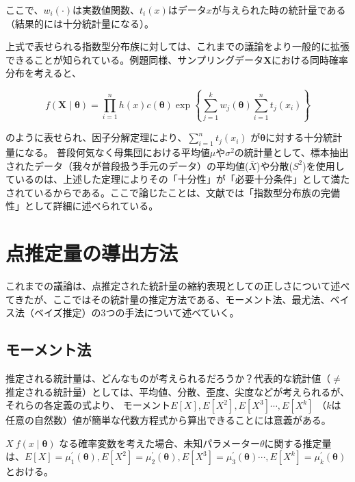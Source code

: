 \documentclass[a4paper,dvipdfmx]{jsarticle}
\begin{document}
ここで、$w_i(\cdot)$は実数値関数、$t_i(x)$はデータ$x$が与えられた時の統計量である（結果的には十分統計量になる）。

上式で表せられる指数型分布族に対しては、これまでの議論をより一般的に拡張できることが知られている。例題同様、サンプリングデータ$\bm{X}$における同時確率分布を考えると、

\begin{equation}
f(\bm{X} \mid \bm{\theta})= \prod_{i=1}^{n}h(x)c(\bm{\theta})\exp\left\{\sum_{j=1}^{k} w_j(\bm{\theta})\sum_{i=1}^{n}t_j(x_i)\right\} \nonumber
\end{equation}


のように表せられ、因子分解定理により、$\sum_{i=1}^{n}t_{j}(x_i)$ が$\bm{\theta}$に対する十分統計量になる。
\vspace{\baselineskip}
普段何気なく母集団における平均値$\mu$や$\sigma^2$の統計量として、標本抽出されたデータ（我々が普段扱う手元のデータ）の平均値($\bar{X}$)や分散($S^2$)を使用しているのは、上述した定理によりその「十分性」が「必要十分条件」として満たされているからである。ここで論じたことは、文献\cite{suuri}では「指数型分布族の完備性」として詳細に述べられている。



\section{点推定量の導出方法}
これまでの議論は、点推定された統計量の縮約表現としての正しさについて述べてきたが、ここではその統計量の推定方法である、モーメント法、最尤法、ベイス法（ベイズ推定）の3つの手法について述べていく。

\subsection{モーメント法}
推定される統計量は、どんなものが考えられるだろうか？代表的な統計値（$\neq$推定される統計量）としては、平均値、分散、歪度、尖度などが考えられるが、それらの各定義の式より、
モーメント$E[X], E[X^2], E[X^3] \cdots, E[X^k]$ （$k$は任意の自然数）値が簡単な代数方程式から算出できることには意義がある。

$X ~ f(x \mid \bm{\theta})$ なる確率変数を考えた場合、未知パラメーター$\theta$に関する推定量は、$E[X]=\mu_{1}^{\prime}(\bm{\theta}), E[X^2]=\mu_{2}^{\prime}(\bm{\theta}), E[X^3]=\mu_{3}^{\prime}(\bm{\theta}) \cdots, E[X^k]=\mu_{k}^{\prime}(\bm{\theta})$ とおける。
\end{document}
